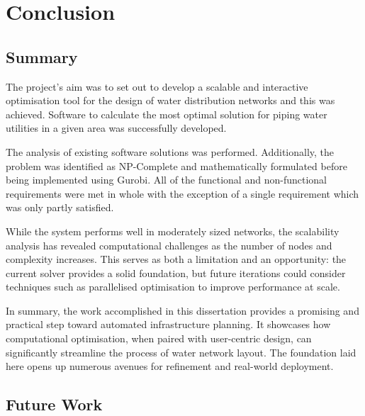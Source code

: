 \chapter{Conclusion}\label{conclusion}

\ifpdf
    \graphicspath{{Chapter6/Figs/Raster/}{Chapter6/Figs/PDF/}{Chapter6/Figs/}}
\else
    \graphicspath{{Chapter6/Figs/Vector/}{Chapter6/Figs/}}
\fi
\section{Summary}
The project's aim was to set out to develop a scalable and interactive optimisation tool for the design of water distribution networks and this was achieved. Software to calculate the most optimal solution for piping water utilities in a given area was successfully developed.

The analysis of existing software solutions was performed. Additionally, the problem was identified as NP-Complete and mathematically formulated before being implemented using Gurobi. All of the functional and non-functional requirements were met in whole with the exception of a single requirement which was only partly satisfied.

While the system performs well in moderately sized networks, the scalability analysis has revealed computational challenges as the number of nodes and complexity increases. This serves as both a limitation and an opportunity: the current solver provides a solid foundation, but future iterations could consider techniques such as parallelised optimisation to improve performance at scale.

In summary, the work accomplished in this dissertation provides a promising and practical step toward automated infrastructure planning. It showcases how computational optimisation, when paired with user-centric design, can significantly streamline the process of water network layout. The foundation laid here opens up numerous avenues for refinement and real-world deployment.

\section{Future Work}


